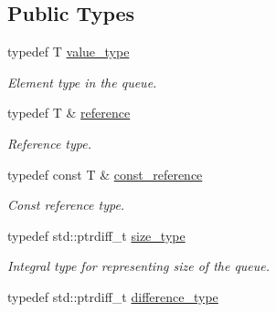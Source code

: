 \subsection*{Public Types}
\begin{DoxyCompactItemize}
\item 
\hypertarget{classtbb_1_1concurrent__queue_accd23aeb7ee44b6452f556406d7336b6}{}typedef T \hyperlink{classtbb_1_1concurrent__queue_accd23aeb7ee44b6452f556406d7336b6}{value\+\_\+type}\label{classtbb_1_1concurrent__queue_accd23aeb7ee44b6452f556406d7336b6}

\begin{DoxyCompactList}\small\item\em Element type in the queue. \end{DoxyCompactList}\item 
\hypertarget{classtbb_1_1concurrent__queue_a71349c9f6c8b4ec9b0f8c9bfc66df11d}{}typedef T \& \hyperlink{classtbb_1_1concurrent__queue_a71349c9f6c8b4ec9b0f8c9bfc66df11d}{reference}\label{classtbb_1_1concurrent__queue_a71349c9f6c8b4ec9b0f8c9bfc66df11d}

\begin{DoxyCompactList}\small\item\em Reference type. \end{DoxyCompactList}\item 
\hypertarget{classtbb_1_1concurrent__queue_a8d12cfefc091c8ca98192f6251318352}{}typedef const T \& \hyperlink{classtbb_1_1concurrent__queue_a8d12cfefc091c8ca98192f6251318352}{const\+\_\+reference}\label{classtbb_1_1concurrent__queue_a8d12cfefc091c8ca98192f6251318352}

\begin{DoxyCompactList}\small\item\em Const reference type. \end{DoxyCompactList}\item 
typedef std\+::ptrdiff\+\_\+t \hyperlink{classtbb_1_1concurrent__queue_aa697402bd9583bd4f26dfd3a912a39d1}{size\+\_\+type}
\begin{DoxyCompactList}\small\item\em Integral type for representing size of the queue. \end{DoxyCompactList}\item 
\hypertarget{classtbb_1_1concurrent__queue_a6363fd8b2b950558641f44538a5897cf}{}typedef std\+::ptrdiff\+\_\+t \hyperlink{classtbb_1_1concurrent__queue_a6363fd8b2b950558641f44538a5897cf}{difference\+\_\+type}\label{classtbb_1_1concurrent__queue_a6363fd8b2b950558641f44538a5897cf}


\end{DoxyCompactItemize}
